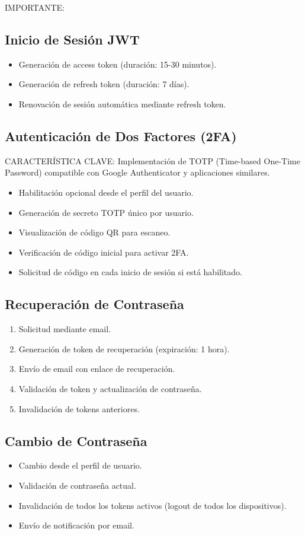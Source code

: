 \documentclass[12pt,a4paper,oneside]{book}
\begin{document}
\begin{alert}{IMPORTANTE:}
\subsection{Inicio de Sesión JWT}
\begin{itemize}
    \item Generación de access token (duración: 15-30 minutos).
    \item Generación de refresh token (duración: 7 días).
    \item Renovación de sesión automática mediante refresh token.
\end{itemize}

\subsection{Autenticación de Dos Factores (2FA)}
\begin{info}{CARACTERÍSTICA CLAVE:} Implementación de TOTP (Time-based One-Time Password) 
compatible con Google Authenticator y aplicaciones similares.

\begin{itemize}
    \item Habilitación opcional desde el perfil del usuario.
    \item Generación de secreto TOTP único por usuario.
    \item Visualización de código QR para escaneo.
    \item Verificación de código inicial para activar 2FA.
    \item Solicitud de código en cada inicio de sesión si está habilitado.
\end{itemize}

\subsection{Recuperación de Contraseña}
\begin{enumerate}
    \item Solicitud mediante email.
    \item Generación de token de recuperación (expiración: 1 hora).
    \item Envío de email con enlace de recuperación.
    \item Validación de token y actualización de contraseña.
    \item Invalidación de tokens anteriores.
\end{enumerate}

\subsection{Cambio de Contraseña}
\begin{itemize}
    \item Cambio desde el perfil de usuario.
    \item Validación de contraseña actual.
    \item Invalidación de todos los tokens activos (logout de todos los dispositivos).
    \item Envío de notificación por email.
\end{itemize}


\end{info}
\end{alert}
\end{document}
